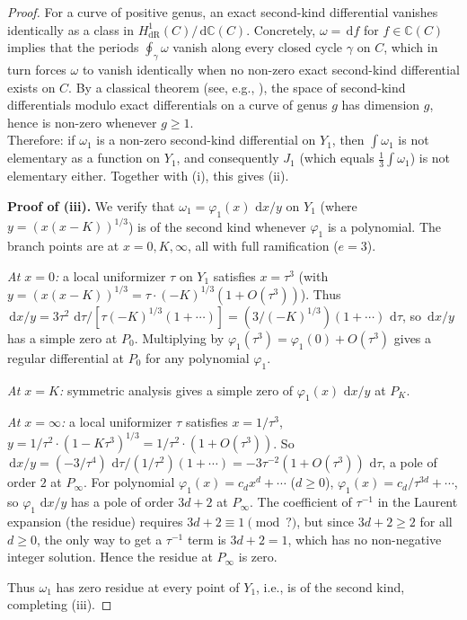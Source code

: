 \documentclass[11pt,a4paper]{article}
\theoremstyle{plain}
\theoremstyle{definition}
\theoremstyle{remark}
\newcommand{\C}{\mathbb{C}}
\renewcommand{\d}{\,\mathrm{d}}
\begin{document}
\begin{proof}
For a curve of positive genus, an exact second-kind differential vanishes identically as a class in $H^1_{\mathrm{dR}}(C)/\d\C(C)$. Concretely, $\omega = \d f$ for $f\in\C(C)$ implies that the periods $\oint_\gamma \omega$ vanish along every closed cycle $\gamma$ on $C$, which in turn forces $\omega$ to vanish identically when no non-zero exact second-kind differential exists on $C$. By a classical theorem (see, e.g., \cite[Ch.\ 5]{Bronstein2005}), the space of second-kind differentials modulo exact differentials on a curve of genus $g$ has dimension $g$, hence is non-zero whenever $g\geq 1$.\\

Therefore: if $\omega_1$ is a non-zero second-kind differential on $Y_1$, then $\int\omega_1$ is not elementary as a function on $Y_1$, and consequently $J_1$ (which equals $\tfrac{1}{3}\int\omega_1$) is not elementary either. Together with (i), this gives (ii).

\smallskip\noindent
\textbf{Proof of (iii).}
We verify that $\omega_1 = \varphi_1(x)\,\d x/y$ on $Y_1$ (where $y=(x(x-K))^{1/3}$) is of the second kind whenever $\varphi_1$ is a polynomial. The branch points are at $x=0,K,\infty$, all with full ramification ($e=3$).

\emph{At $x=0$:} a local uniformizer $\tau$ on $Y_1$ satisfies $x = \tau^3$ (with $y=(x(x-K))^{1/3}=\tau\cdot(-K)^{1/3}(1+O(\tau^3))$). Thus $\d x/y = 3\tau^2\,\d\tau / [\tau(-K)^{1/3}(1+\cdots)] = (3/(-K)^{1/3})(1+\cdots)\,\d\tau$, so $\d x/y$ has a simple zero at $P_0$. Multiplying by $\varphi_1(\tau^3) = \varphi_1(0) + O(\tau^3)$ gives a regular differential at $P_0$ for any polynomial $\varphi_1$.

\emph{At $x=K$:} symmetric analysis gives a simple zero of $\varphi_1(x)\,\d x/y$ at $P_K$.

\emph{At $x=\infty$:} a local uniformizer $\tau$ satisfies $x = 1/\tau^3$, $y = 1/\tau^2 \cdot (1-K\tau^3)^{1/3} = 1/\tau^2 \cdot (1+O(\tau^3))$. So $\d x/y = (-3/\tau^4)\,\d\tau / (1/\tau^2)(1+\cdots) = -3\tau^{-2}(1+O(\tau^3))\,\d\tau$, a pole of order $2$ at $P_\infty$. For polynomial $\varphi_1(x) = c_d x^d + \cdots$ ($d\geq 0$), $\varphi_1(x) = c_d/\tau^{3d} + \cdots$, so $\varphi_1\,\d x/y$ has a pole of order $3d+2$ at $P_\infty$. The coefficient of $\tau^{-1}$ in the Laurent expansion (the residue) requires $3d+2 \equiv 1 \pmod{?}$, but since $3d+2 \geq 2$ for all $d\geq 0$, the only way to get a $\tau^{-1}$ term is $3d+2 = 1$, which has no non-negative integer solution. Hence the residue at $P_\infty$ is zero.

Thus $\omega_1$ has zero residue at every point of $Y_1$, i.e., is of the second kind, completing (iii).
\end{proof}
\end{document}

